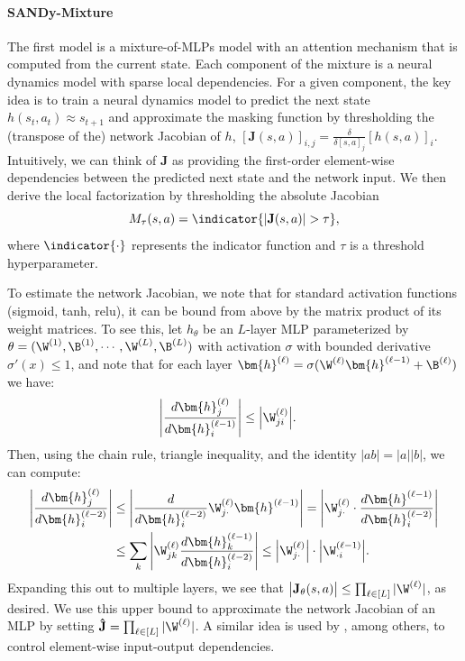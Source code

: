 \documentclass[coda.tex]{subfiles}
\begin{document}
\paragraph{SANDy-Mixture} 

The first model is a mixture-of-MLPs model with an attention mechanism that is computed from the current state.
Each component of the mixture is a neural dynamics model with sparse local dependencies. 
For a given component, the key idea is to train a neural dynamics model to predict the next state $h(s_t, a_t) \approx s_{t+1}$ and approximate the masking function by thresholding the (transpose of the) network Jacobian of $h$, $[\mathbf{J}(s, a)]_{i, j} = \frac{\delta}{\delta [s, a]_j} [h(s, a)]_i$. Intuitively, we can think of $\mathbf{J}$ as providing the first-order element-wise dependencies between the predicted next state and the network input. We then derive the local factorization by thresholding the absolute Jacobian 
\begin{equation}
M_\tau(s, a) = \indicator{|\mathbf{J}(s, a)| > \tau},    
\label{eq:thresh}
\end{equation}
where $\indicator{\cdot}$ represents the indicator function and $\tau$ is a threshold hyperparameter.

To estimate the network Jacobian, we note that for standard activation functions (sigmoid, tanh, relu), it can be bound from above by the matrix product of its weight matrices. To see this, let $h_\theta$ be an $L$-layer MLP parameterized by $\theta = (\W^{(1)}, \B^{(1)}, \cdots, \W^{(L)}, \B^{(L)})$ with activation $\sigma$ with bounded derivative $\sigma'(x) \leq 1$, and note that for each layer $\bm{h}^{(\ell)} = \sigma(\W^{(\ell)}\bm{h}^{(\ell -1)} + \B^{(\ell)})$ we have:
\begin{align*}
	\Bigg\vert\frac{d\bm{h}^{(\ell)}_j}{d\bm{h}^{(\ell-1)}_i}\Bigg\vert &\leq \Big\vert\W^{(\ell)}_{ji}\Big\vert.
\end{align*}
Then, using the chain rule, triangle inequality, and the identity $|ab| = |a||b|$, we can compute:
\begin{align*}
	\Bigg\vert\frac{d\bm{h}^{(\ell)}_j}{d\bm{h}^{(\ell-2)}_i}\Bigg\vert &\leq \Bigg\vert\frac{d}{d\bm{h}^{(\ell-2)}_i}   \W^{(\ell)}_{j\cdot} \bm{h}^{(\ell-1)}\Bigg\vert =\Bigg\vert\W^{(\ell)}_{j\cdot} \cdot \frac{d\bm{h}^{(\ell-1)}}{d\bm{h}^{(\ell-2)}_i} \Bigg\vert \\
	&
	\leq \sum_k \Bigg\vert\W^{(\ell)}_{jk} \frac{d\bm{h}^{(\ell-1)}_k}{d\bm{h}^{(\ell-2)}_i} \Bigg\vert 
	\leq \Big\vert\W^{(\ell)}_{j\cdot} \Big\vert \cdot \Big\vert\W^{(\ell-1)}_{\cdot i} \Big\vert.
\end{align*}
Expanding this out to multiple layers, we see that $\big\vert \mathbf{J}_\theta(s, a)\big\vert  \leq \prod_{\ell \in [L]} |\W^{(\ell)}|$, as desired. We use this upper bound to approximate the network Jacobian of an MLP by setting $\mathbf{\hat J} = \prod_{\ell \in [L]} |\W^{(\ell)}|$. A similar idea is used by \cite{germain2015made,lachapelle2019gradient}, among others, to control element-wise input-output dependencies.
\end{document}

